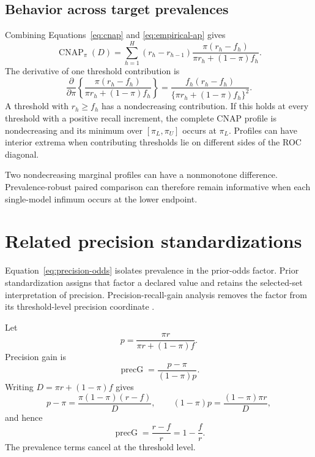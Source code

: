 \documentclass[11pt]{article}
\newcommand{\CNAP}{\operatorname{CNAP}}
\theoremstyle{remark}
\begin{document}
\subsection{Behavior across target prevalences}

Combining Equations~\eqref{eq:cnap} and \eqref{eq:empirical-ap} gives
\begin{equation}
\CNAP_\pi(D)
=
\sum_{h=1}^{H}
(r_h-r_{h-1})
\frac{\pi(r_h-f_h)}
{\pi r_h+(1-\pi)f_h}.
\label{eq:empirical-cnap-profile}
\end{equation}
The derivative of one threshold contribution is
\begin{equation}
\frac{\partial}{\partial\pi}
\left\{
\frac{\pi(r_h-f_h)}
{\pi r_h+(1-\pi)f_h}
\right\}
=
\frac{f_h(r_h-f_h)}
{\{\pi r_h+(1-\pi)f_h\}^2}.
\label{eq:profile-derivative}
\end{equation}
A threshold with $r_h\geq f_h$ has a nondecreasing contribution. If this holds at every threshold with a positive recall increment, the complete CNAP profile is nondecreasing and its minimum over $[\pi_L,\pi_U]$ occurs at $\pi_L$. Profiles can have interior extrema when contributing thresholds lie on different sides of the ROC diagonal.

Two nondecreasing marginal profiles can have a nonmonotone difference. Prevalence-robust paired comparison can therefore remain informative when each single-model infimum occurs at the lower endpoint.

\section{Related precision standardizations}
\label{app:related}

Equation~\eqref{eq:precision-odds} isolates prevalence in the prior-odds factor. Prior standardization assigns that factor a declared value and retains the selected-set interpretation of precision. Precision-recall-gain analysis removes the factor from its threshold-level precision coordinate \cite{flach2015prg}.

Let
\[
p
=
\frac{\pi r}{\pi r+(1-\pi)f}.
\]
Precision gain is
\[
\operatorname{precG}
=
\frac{p-\pi}{(1-\pi)p}.
\]
Writing $D=\pi r+(1-\pi)f$ gives
\[
p-\pi
=
\frac{\pi(1-\pi)(r-f)}{D},
\qquad
(1-\pi)p
=
\frac{(1-\pi)\pi r}{D},
\]
and hence
\begin{equation}
\operatorname{precG}
=
\frac{r-f}{r}
=
1-\frac{f}{r}.
\label{eq:precision-gain}
\end{equation}
The prevalence terms cancel at the threshold level.
\end{document}
